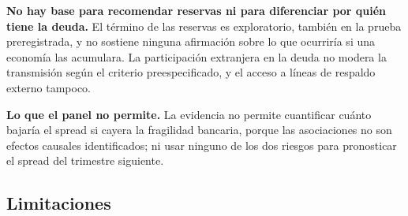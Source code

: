 \textbf{No hay base para recomendar reservas ni para diferenciar por quién tiene la deuda.} El término de las reservas es exploratorio, también en la prueba preregistrada, y no sostiene ninguna afirmación sobre lo que ocurriría si una economía las acumulara. La participación extranjera en la deuda no modera la transmisión según el criterio preespecificado, y el acceso a líneas de respaldo externo tampoco.

\textbf{Lo que el panel no permite.} La evidencia no permite cuantificar cuánto bajaría el spread si cayera la fragilidad bancaria, porque las asociaciones no son efectos causales identificados; ni usar ninguno de los dos riesgos para pronosticar el spread del trimestre siguiente.

\subsection{Limitaciones}

